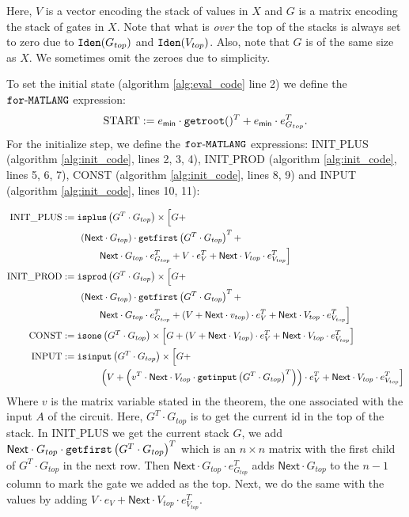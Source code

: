     Here, $V$ is a vector encoding the stack of values in $X$ and $G$ is a matrix encoding the stack of gates in $X$.
    Note that what is \textit{over} the top of the stacks is always set to zero due to $\texttt{Iden}(G_{top})$ and $\texttt{Iden}(V_{top})$.
    Also, note that $G$ is of the same size as $X$. We sometimes omit the zeroes due to simplicity.

    To set the initial state (algorithm \ref{alg:eval_code} line 2) we define the $\texttt{for}\text{-}\texttt{MATLANG}$ expression: $$\text{START}:= e_{\mathsf{min}}\cdot \texttt{getroot}()^T + e_{\mathsf{min}}\cdot e_{G_{top}}^T.$$
    For the initialize step, we define the $\texttt{for}\text{-}\texttt{MATLANG}$ expressions: INIT${\_}$PLUS (algorithm \ref{alg:init_code}, lines 2, 3, 4), INIT${\_}$PROD (algorithm \ref{alg:init_code}, lines 5, 6, 7), CONST (algorithm \ref{alg:init_code}, lines 8, 9) and INPUT (algorithm \ref{alg:init_code}, lines 10, 11):

    \begin{align*}
        \text{INIT{\_}PLUS} &:= \texttt{isplus}\left( G^T\cdot G_{top} \right)\times \Big[ G + \\
        &\hspace{2em}(\mathsf{Next}\cdot G_{top}) \cdot \texttt{getfirst}\left(G^T\cdot G_{top} \right)^T  + \\
        &\hspace{4em}\mathsf{Next}\cdot G_{top}\cdot e_{G_{top}}^T +V\cdot e_{V}^T + \mathsf{Next}\cdot V_{top}\cdot e_{V_{top}}^T \Big] \\
        \text{INIT{\_}PROD} &:= \texttt{isprod}\left(G^T\cdot G_{top} \right)\times \Big[ G + \\
        &\hspace{2em}(\mathsf{Next}\cdot G_{top}) \cdot \texttt{getfirst}\left(G^T\cdot G_{top} \right)^T + \\
        &\hspace{4em}\mathsf{Next}\cdot G_{top}\cdot e_{G_{top}}^T +(V + \mathsf{Next}\cdot v_{top})\cdot e_{V}^T + \mathsf{Next}\cdot V_{top}\cdot e_{V_{top}}^T \Big] \\
        \text{CONST} &:= \texttt{isone}\left(G^T\cdot G_{top} \right)\times \left[ G + (V + \mathsf{Next}\cdot V_{top})\cdot e_{V}^T + \mathsf{Next}\cdot V_{top}\cdot e_{V_{top}}^T \right] \\
        \text{INPUT} &:= \texttt{isinput}\left(G^T\cdot G_{top} \right)\times \Big[ G + \\
        &\hspace{4em}\left(V + \left( v^T \cdot \mathsf{Next}\cdot V_{top} \cdot \texttt{getinput}\left(G^T\cdot G_{top} \right)^T \right)\right)\cdot e_{V}^T + \mathsf{Next}\cdot V_{top}\cdot e_{V_{top}}^T \Big]
    \end{align*} 
    Where $v$ is the matrix variable stated in the theorem, the one associated with the input $A$ of the circuit.
    Here, $G^T\cdot G_{top}$ is to get the current id in the top of the stack. In INIT${\_}$PLUS we get the current stack $G$, we add $\mathsf{Next}\cdot G_{top} \cdot \texttt{getfirst}\left(G^T\cdot G_{top} \right)^T$ which is an $n\times n$ matrix with the first child of $G^T\cdot G_{top}$ in the next row. Then $\mathsf{Next}\cdot G_{top}\cdot e_{G_{top}}^T$ adds $\mathsf{Next}\cdot G_{top}$ to the $n-1$ column to mark the gate we added as the top. Next, we do the same with the values by adding $V\cdot e_{V} + \mathsf{Next}\cdot V_{top}\cdot e_{V_{top}}^T$.

